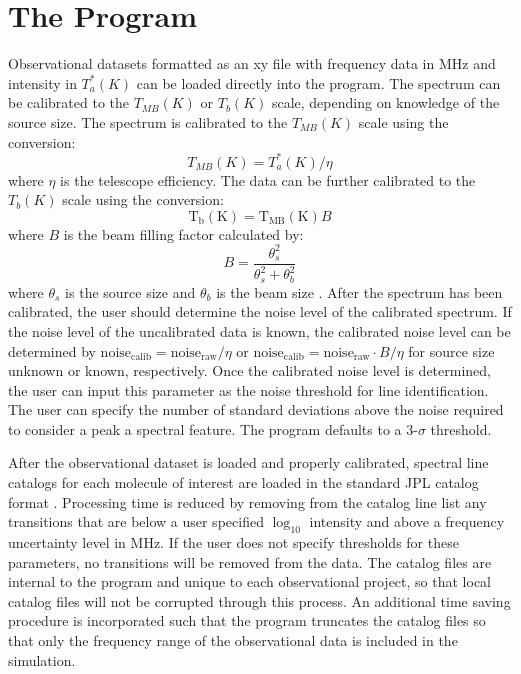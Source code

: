 \section{The Program}
Observational datasets formatted as an xy file with frequency data in MHz and intensity in $T_a^*(K)$ can be loaded directly into the program.  The spectrum can be calibrated to the $T_{MB}(K)$ or $T_b(K)$ scale, depending on knowledge of the source size.  The spectrum is calibrated to the $T_{MB}(K)$ scale using the conversion:
$$T_{MB}(K) = T_a^*(K)/\eta$$
where $\eta$ is the telescope efficiency.  The data can be further calibrated to the $T_b(K)$ scale using the conversion:
$$\text{T}_\text{b}(\text{K}) = \text{T}_\text{MB}(\text{K}) B$$
where $B$ is the beam filling factor calculated by:
$$B = \frac{\theta_s^2}{\theta_s^2 + \theta_b^2}$$
where $\theta_s$ is the source size and $\theta_b$ is the beam size \citep{NummelinAA_1998}.
After the spectrum has been calibrated, the user should determine the noise level of the calibrated spectrum.  If the noise level of the uncalibrated data is known, the calibrated noise level can be determined by $\text{noise}_\text{calib} = \text{noise}_\text{raw} /\eta$ or $\text{noise}_\text{calib} = \text{noise}_\text{raw} \cdot B/\eta$ for source size unknown or known, respectively.  Once the calibrated noise level is determined, the user can input this parameter as the noise threshold for line identification.  The user can specify the number of standard deviations above the noise required to consider a peak a spectral feature.  The program defaults to a $3$-$\sigma$ threshold.

After the observational dataset is loaded and properly calibrated, spectral line catalogs for each molecule of interest are loaded in the standard JPL catalog format \citep{Pickett_1998}. Processing time is reduced by removing from the catalog line list any transitions that are below a user specified $\log_{10}$ intensity and above a frequency uncertainty level in MHz.  If the user does not specify thresholds for these parameters, no transitions will be removed from the data.  The catalog files are internal to the program and unique to each observational project, so that local catalog files will not be corrupted through this process.  An additional time saving procedure is incorporated such that the program truncates the catalog files so that only the frequency range of the observational data is included in the simulation.

